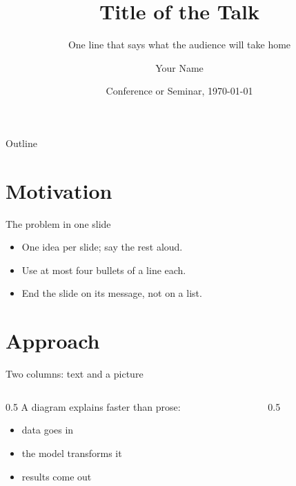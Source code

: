 \documentclass[aspectratio=169,11pt]{beamer}
\title{Title of the Talk}
\subtitle{One line that says what the audience will take home}
\author{Your Name}
\institute{Institution}
\date{Conference or Seminar, \today}
\begin{document}
\begin{frame}[plain]
  \titlepage
\end{frame}

\begin{frame}{Outline}
  \tableofcontents
\end{frame}

\section{Motivation}
\begin{frame}{The problem in one slide}
  \begin{itemize}
    \item One idea per slide; say the rest aloud.
    \item Use at most four bullets of a line each.
    \item End the slide on its message, not on a list.
  \end{itemize}
\end{frame}

\section{Approach}
\begin{frame}{Two columns: text and a picture}
  \begin{columns}[T]
    \begin{column}{0.5\textwidth}
      A diagram explains faster than prose:
      \begin{itemize}
        \item data goes in
        \item the model transforms it
        \item results come out
      \end{itemize}
    \end{column}
    \begin{column}{0.5\textwidth}
      \centering
    \end{column}
  \end{columns}
\end{frame}
\end{document}
